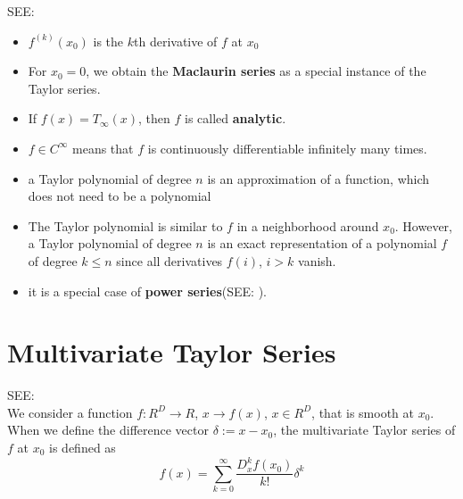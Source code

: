 SEE: 
\begin{itemize}
    \item $f^{(k)}(x_0)$ is the $k$th derivative of $f$ at $x_0$

    \item For $x_0 = 0$, we obtain the \textbf{Maclaurin series} as a special instance of the Taylor series. 
    
    \item If $f(x) = T_\infty(x)$, then $f$ is called \textbf{analytic}.
    
    \item $f \in C^\infty$ means that $f$ is continuously differentiable infinitely many times.

    \item a Taylor polynomial of degree $n$ is an approximation of a function, which does not need to be a polynomial

    \item The Taylor polynomial is similar to $f$ in a neighborhood around $x_0$. However, a Taylor polynomial of degree $n$ is an exact representation of a polynomial $f$ of degree $k \leq n$ since all derivatives $f(i)$, $i > k$ vanish.

    \item it is a special case of \textbf{power series}(SEE: ).

\end{itemize}


\section{Multivariate Taylor Series}\label{Multivariate Taylor Series}

SEE: \\
We consider a function $f : R^D \rightarrow R$, $x \rightarrow f(x)$, $x \in R^D$, that is smooth at $x_0$. When we define the difference vector $\delta := x - x_0$, the multivariate Taylor series of $f$ at $x_0$ is defined as
\[
    f(x) = \sum_{k=0}^{\infty} \displaystyle\frac{D_x^k f(x_0)}{k!}\delta^k
\]

